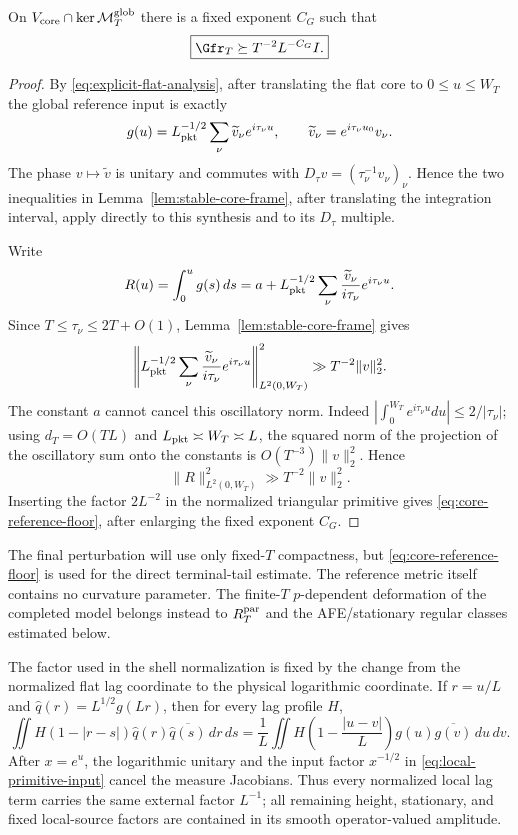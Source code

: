 \begin{lemma}
\label{lem:core-reference-floor}
On $V_{\rm core}\cap\ker\mathcal M_T^{\rm glob}$ there is a fixed exponent
$C_G$ such that
\begin{equation}
\boxed{
\Gfr_T\succeq T^{-2}L^{-C_G}I.
}
\label{eq:core-reference-floor}
\end{equation}
\end{lemma}

\begin{proof}
By \eqref{eq:explicit-flat-analysis}, after translating the flat core to
$0\le u\le W_T$ the global reference input is exactly
\[
g(u)=L_{\rm pkt}^{-1/2}\sum_\nu
\widetilde v_\nu e^{i\tau_\nu u},
\qquad
\widetilde v_\nu=e^{i\tau_\nu u_0}v_\nu.
\]
The phase $v\mapsto\widetilde v$ is unitary and commutes with
$D_\tau v=(\tau_\nu^{-1}v_\nu)_\nu$. Hence the two inequalities in
Lemma~\ref{lem:stable-core-frame}, after translating the integration interval,
apply directly to this synthesis and to its $D_\tau$ multiple.

Write
\[
R(u)=\int_0^u g(s)\,ds
=a+L_{\rm pkt}^{-1/2}\sum_\nu
\frac{\widetilde v_\nu}{i\tau_\nu}e^{i\tau_\nu u}.
\]
Since $T\le\tau_\nu\le2T+O(1)$, Lemma~\ref{lem:stable-core-frame} gives
\[
\left\|L_{\rm pkt}^{-1/2}\sum_\nu
\frac{\widetilde v_\nu}{i\tau_\nu}e^{i\tau_\nu u}
\right\|_{L^2(0,W_T)}^2
\gg T^{-2}\|v\|_2^2.
\]
The constant $a$ cannot cancel this oscillatory norm. Indeed
$|\int_0^{W_T}e^{i\tau_\nu u}du|\le2/|\tau_\nu|$; using
$d_T=O(TL)$ and $L_{\rm pkt}\asymp W_T\asymp L$, the squared norm of the
projection of the oscillatory sum onto the constants is
$O(T^{-3})\|v\|_2^2$. Hence
\[
\|R\|_{L^2(0,W_T)}^2\gg T^{-2}\|v\|_2^2.
\]
Inserting the factor $2L^{-2}$ in the normalized triangular primitive gives
\eqref{eq:core-reference-floor}, after enlarging the fixed exponent $C_G$.
\end{proof}

The final perturbation will use only fixed-$T$ compactness, but
\eqref{eq:core-reference-floor} is used for the direct terminal-tail estimate.
The reference metric itself contains no curvature parameter.  The finite-$T$
$p$-dependent deformation of the completed model belongs instead to
$R_T^{\rm par}$ and the AFE/stationary regular classes estimated below.

The factor used in the shell normalization is fixed by the change from the
normalized flat lag coordinate to the physical logarithmic coordinate. If
$r=u/L$ and \(\widehat q(r)=L^{1/2}g(Lr)\), then for every lag profile $H$,
\begin{equation}
\iint H(1-|r-s|)\widehat q(r)\overline{\widehat q(s)}\,dr\,ds
=\frac1L\iint
H\!\left(1-\frac{|u-v|}{L}\right)
g(u)\overline{g(v)}\,du\,dv.
\label{eq:flat-lag-jacobian}
\end{equation}
After $x=e^u$, the logarithmic unitary and the input factor
$x^{-1/2}$ in \eqref{eq:local-primitive-input} cancel the measure Jacobians.
Thus every normalized local lag term carries the same external factor $L^{-1}$;
all remaining height, stationary, and fixed local-source factors are contained
in its smooth operator-valued amplitude.

